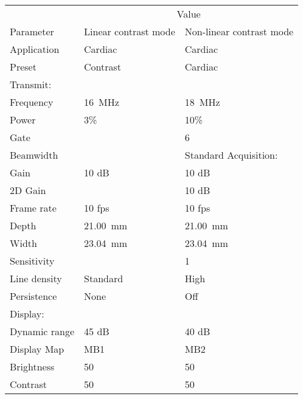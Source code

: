 \documentclass[b5paper, twoside, titlepage, 10pt]{article}
\begin{document}
\setcounter{equation}{41}
\begin{tabular}{@{}l l l @{}}
\toprule
& \multicolumn{2}{c}{Value} \\ \cmidrule(r){2-3}
Parameter & Linear contrast mode & Non-linear contrast mode\\
\midrule
Application & Cardiac & Cardiac\\
Preset & Contrast & Cardiac\\
Transmit:\\
Frequency & \SI{16}{\mega\hertz} & \SI{18}{\mega\hertz}\\
Power & 3\% & 10\%\\
Gate & & 6\\
Beamwidth & & Standard
Acquisition:\\
Gain & 10 dB & 10 dB\\
2D Gain & & 10 dB\\  
Frame rate & 10 fps & 10 fps\\
Depth & \SI{21.00}{\milli\meter} & \SI{21.00}{\milli\meter}\\
Width & \SI{23.04}{\milli\meter} & \SI{23.04}{\milli\meter}\\
Sensitivity & &1\\
Line density & Standard & High \\ 
Persistence & None & Off \\
Display:\\
Dynamic range &45 dB &40 dB \\
Display Map & MB1 & MB2\\
Brightness & 50 & 50\\
Contrast & 50 & 50 \\
  \bottomrule
\end{tabular}
\end{document}
